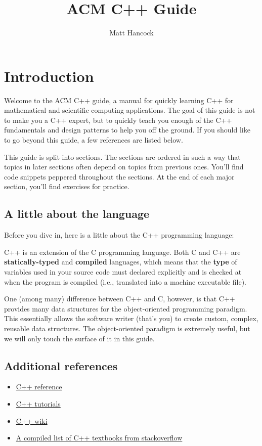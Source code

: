 \documentclass[11pt]{article}
\author{Matt Hancock}
\date{}
\title{ACM C++ Guide}
\begin{document}
\maketitle
\tableofcontents


\section{Introduction}
\label{sec-1}
Welcome to the ACM C++ guide, a manual for quickly learning C++
for mathematical and scientific computing applications. The goal of 
this guide is not to make you a C++ expert, but to quickly teach 
you enough of the C++ fundamentals and design patterns to help you 
off the ground. If you should like to go beyond this guide, a 
few references are listed below.

This guide is split into sections. The sections are ordered in such a way
that topics in later sections often depend on topics from previous ones. 
You'll find code snippets peppered throughout the sections. At the end of 
each major section, you'll find exercises for practice.

\subsection{A little about the language}
\label{sec-1-1}
Before you dive in, here is a little about the C++ programming language:

C++ is an extension of the C programming language. Both C and C++ are 
\textbf{statically-typed} and \textbf{compiled} languages, which means that the \textbf{type} 
of variables used in your source code must declared explicitly and is 
checked at when the program is compiled (i.e., translated into a machine 
executable file).

One (among many) difference between C++ and C, however, is that C++ provides 
many data structures for the object-oriented programming paradigm. This 
essentially allows the software writer (that's you) to create custom, complex, 
reusable data structures. The object-oriented paradigm is extremely useful, 
but we will only touch the surface of it in this guide.

\subsection{Additional references}
\label{sec-1-2}
\begin{itemize}
\item \href{http://cppreference.com}{C++ reference}
\item \href{http://www.cplusplus.com/doc/tutorial}{C++ tutorials}
\item \href{https://en.wikipedia.org/wiki/C\%2B\%2B}{C++ wiki}
\item \href{http://stackoverflow.com/questions/388242/the-definitive-c-book-guide-and-list}{A compiled list of C++ textbooks from stackoverflow}
\end{itemize}
\end{document}
